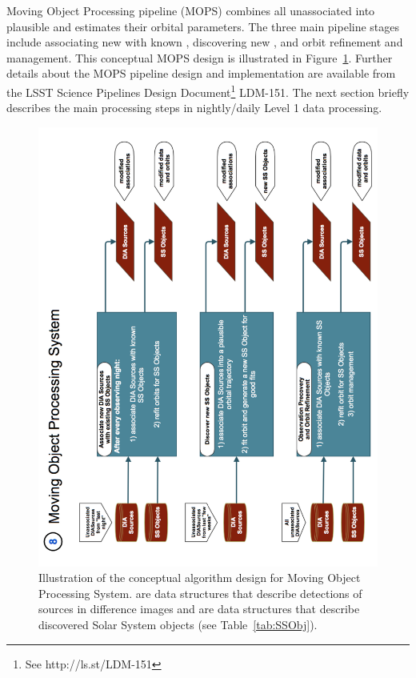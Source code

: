 Moving Object Processing pipeline (MOPS) combines all unassociated \DIASources into 
plausible \SSObjects and estimates their orbital parameters. The three main pipeline stages
include associating new \DIASources with known \SSObjects, discovering new \SSObjects, 
and orbit refinement and management. This conceptual MOPS design is illustrated in  
Figure~\ref{fig:Pipe8}. Further details about the MOPS pipeline design and implementation are available
from the LSST Science Pipelines Design Document\footnote{See http://ls.st/LDM-151} LDM-151.
The next section briefly describes the main processing steps in nightly/daily Level 1 data processing. 

\begin{figure}[!t]
    \centering
    \includegraphics[scale=0.50, angle=270]{MOPS-Level0}
    \vskip -0.1in 
    \caption{Illustration of the conceptual algorithm design for Moving Object Processing System. 
   \DIASources are data structures that describe detections of sources in difference images and 
   \SSObjects are data structures that describe discovered Solar System objects (see Table~\ref{tab:SSObj}).
\label{fig:Pipe8}}    
\end{figure}


